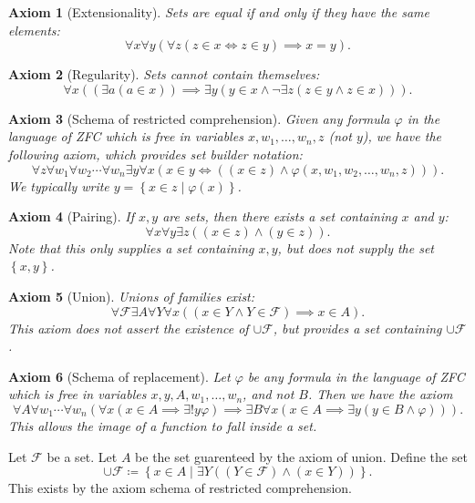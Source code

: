 \documentclass{article}
\newtheorem{axiom}{Axiom}
\begin{document}
\begin{axiom}[Extensionality]\label{axiom:extensionality}
	Sets are equal if and only if they have the same elements:
	\[
		\forall x\forall y\left( \forall z\left( z\in x \iff z\in y \right) \implies x=y \right) 
	.\]
\end{axiom}
\begin{axiom}[Regularity]\label{axiom:regularity}
	Sets cannot contain themselves:
	\[
		\forall x\left( (\exists a(a\in x))\implies \exists y(y\in x \land \neg \exists z(z\in y\land  z\in x)) \right) 
	.\]
\end{axiom}
\begin{axiom}[Schema of restricted comprehension]\label{axiom:comprehension}
	Given any formula $\varphi $ in the language of ZFC which is free in variables $x,w_1, \ldots , w_n,z$ (not $y$), we have the following axiom, which provides set builder notation:
	\[
		\forall z\forall w_1 \forall w_2 \cdots \forall w_n \exists y\forall x\left( x\in y \iff ((x\in z) \land \varphi (x, w_1, w_2, \ldots , w_n, z)) \right) 
	.\]
	We typically write $y=\left\{ x\in z\mid \varphi (x) \right\} $.
\end{axiom}
\begin{axiom}[Pairing]\label{axiom:pairing}
	If $x,y$ are sets, then there exists a set containing $x$ and $y$:
	\[
		\forall x\forall y\exists z\left( (x\in z)\land (y\in z) \right) 
	.\]
	Note that this only supplies a set containing $x,y$, but does not supply the set $\left\{ x,y \right\} $.
\end{axiom}
\begin{axiom}[Union]\label{axiom:union}
	Unions of families exist:
	\[
		\forall \mathcal{F} \exists A \forall Y\forall x\left( (x\in Y \land Y\in \mathcal{F} ) \implies x\in A \right) 
	.\]
	This axiom does not assert the existence of $\cup \mathcal{F} $, but provides a set containing $\cup \mathcal{F} $.
\end{axiom}
\begin{axiom}[Schema of replacement]\label{axiom:replacement}
	Let $\varphi $ be any formula in the language of ZFC which is free in variables $x,y,A,w_1, \ldots , w_n$, and not $B$. Then we have the axiom
	\[
		\forall A \forall w_1 \cdots \forall w_n\left( \forall x\left( x\in A \implies \exists !y\varphi  \right) \implies \exists B\forall x\left( x\in A \implies \exists y(y\in B \land \varphi ) \right)  \right) 
	.\]
	This allows the image of a function to fall inside a set.
\end{axiom}
\begin{definition}\label{dfn:union}
	Let $\mathcal{F} $ be a set. Let $A$ be the set guarenteed by the axiom of union. Define the set
	\[
		\cup \mathcal{F} \coloneqq \left\{ x\in A \mid \exists Y((Y\in \mathcal{F} )\land (x\in Y)) \right\} 
	.\]
	This exists by the axiom schema of restricted comprehension.
\end{definition}
\end{document}
